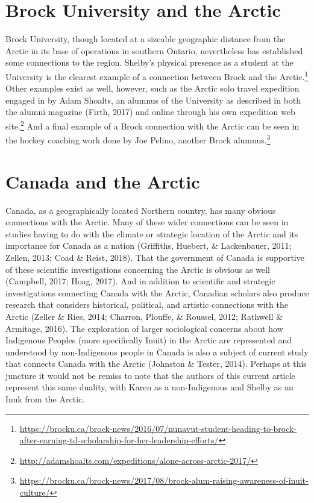 \documentclass[a4paper,
fontsize=11pt,
oneside,
numbers=noperiodatend,
parskip=half-,
bibliography=totoc,
final
]{scrartcl}
\begin{document}
\hypertarget{brock-university-and-the-arctic}{%
\section{Brock University and the
Arctic}\label{brock-university-and-the-arctic}}

Brock University, though located at a sizeable geographic distance from
the Arctic in its base of operations in southern Ontario, nevertheless
has established some connections to the region. Shelby's physical
presence as a student at the University is the clearest example of a
connection between Brock and the Arctic.\footnote{\url{https://brocku.ca/brock-news/2016/07/nunavut-student-heading-to-brock-after-earning-td-scholarship-for-her-leadership-efforts/}}
Other examples exist as well, however, such as the Arctic solo travel
expedition engaged in by Adam Shoalts, an alumnus of the University as
described in both the alumni magazine (Firth, 2017) and online through
his own expedition web site.\footnote{\url{http://adamshoalts.com/expeditions/alone-across-arctic-2017/}}
And a final example of a Brock connection with the Arctic can be seen in
the hockey coaching work done by Joe Pelino, another Brock
alumnus.\footnote{\url{https://brocku.ca/brock-news/2017/08/brock-alum-raising-awareness-of-inuit-culture/}}

\hypertarget{canada-and-the-arctic}{%
\section{Canada and the Arctic}\label{canada-and-the-arctic}}

Canada, as a geographically located Northern country, has many obvious
connections with the Arctic. Many of these wider connections can be seen
in studies having to do with the climate or strategic location of the
Arctic and its importance for Canada as a nation (Griffiths, Huebert, \&
Lackenbauer, 2011; Zellen, 2013; Coad \& Reist, 2018). That the
government of Canada is supportive of these scientific investigations
concerning the Arctic is obvious as well (Campbell, 2017; Hoag, 2017).
And in addition to scientific and strategic investigations connecting
Canada with the Arctic, Canadian scholars also produce research that
considers historical, political, and artistic connections with the
Arctic (Zeller \& Ries, 2014; Charron, Plouffe, \& Roussel, 2012;
Rathwell \& Armitage, 2016). The exploration of larger sociological
concerns about how Indigenous Peoples (more specifically Inuit) in the
Arctic are represented and understood by non-Indigenous people in Canada
is also a subject of current study that connects Canada with the Arctic
(Johnston \& Tester, 2014). Perhaps at this juncture it would not be
remiss to note that the authors of this current article represent this
same duality, with Karen as a non-Indigenous and Shelby as an Inuk from
the Arctic.
\end{document}
